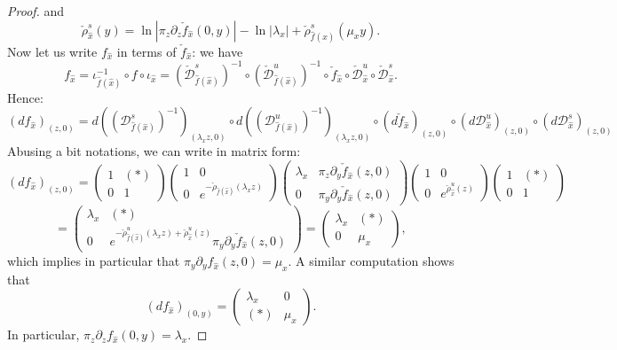 \documentclass[a4paper]{article}
\theoremstyle{definition}
\begin{document}
\begin{proof}
and $$ \check{\rho}_{\widehat{x}}^s(y) = \ln |\pi_z \partial_z \check{f}_{\widehat{x}}(0,y)| - \ln |\lambda_x| + \check{\rho}^s_{\widehat{f}({\widehat{x}})}(\mu_x y) .$$
Now let us write $f_{\widehat{x}}$ in terms of $\check{f}_{\widehat{x}}$: we have
$$ f_{\widehat{x}} = \iota_{\widehat{f}({\widehat{x}})}^{-1} \circ f \circ \iota_{\widehat{x}} = (\check{\mathcal{D}}_{\widehat{f}({\widehat{x}})}^s)^{-1} \circ (\check{\mathcal{D}}_{\widehat{f}({\widehat{x}})}^u)^{-1} \circ \check{f}_{\widehat{x}} \circ \check{\mathcal{D}}_{{\widehat{x}}}^u \circ \check{\mathcal{D}}_{{\widehat{x}}}^s. $$
Hence:
$$ (df_{\widehat{x}})_{(z,0)} = d((\mathcal{D}_{\widehat{f}({\widehat{x}})}^s)^{-1})_{(\lambda_x z,0)} \circ d((\mathcal{D}_{\widehat{f}({\widehat{x}})}^u)^{-1})_{(\lambda_x z,0)} \circ (d\check{f}_{\widehat{x}})_{(z,0)} \circ (d \mathcal{D}_{\widehat{x}}^u)_{(z,0)} \circ (d \mathcal{D}_{\widehat{x}}^s)_{(z,0)} $$
Abusing a bit notations, we can write in matrix form:
$$ (df_{\widehat{x}})_{(z,0)} = \begin{pmatrix} 1 & (*) \\ 0 & 1 \end{pmatrix} \begin{pmatrix} 1 & 0 \\ 0 & e^{-\check{\rho}_{\widehat{f}({\widehat{x}})}(\lambda_x z)} \end{pmatrix} \begin{pmatrix} \lambda_x & \pi_z \partial_y \check{f}_{\widehat{x}}(z,0) \\ 0 & \pi_y \partial_y \check{f}_{\widehat{x}}(z,0) \end{pmatrix} \begin{pmatrix} 1 & 0 \\ 0 & e^{\check{\rho}_{\widehat{x}}^u(z)} \end{pmatrix} \begin{pmatrix} 1 & (*) \\ 0 & 1 \end{pmatrix}  $$
$$ = \begin{pmatrix} \lambda_x & (*) \\ 0 & e^{-\check{\rho}_{\widehat{f}({\widehat{x}})}^u(\lambda_x z) + \check{\rho}_{\widehat{x}}^u(z)} \pi_y \partial_y \check{f}_{\widehat{x}}(z,0) \end{pmatrix} = \begin{pmatrix} \lambda_x & (*) \\ 0 & \mu_x \end{pmatrix} ,$$
which implies in particular that $\pi_y \partial_y f_{\widehat{x}}(z,0) = \mu_x$. A similar computation shows that
$$ (df_{\widehat{x}})_{(0,y)} = \begin{pmatrix} \lambda_x & 0 \\ (*) & \mu_x \end{pmatrix} .$$
In particular, $\pi_z \partial_z f_{\widehat{x}}(0,y) = \lambda_x$. 
\end{proof}
\end{document}
